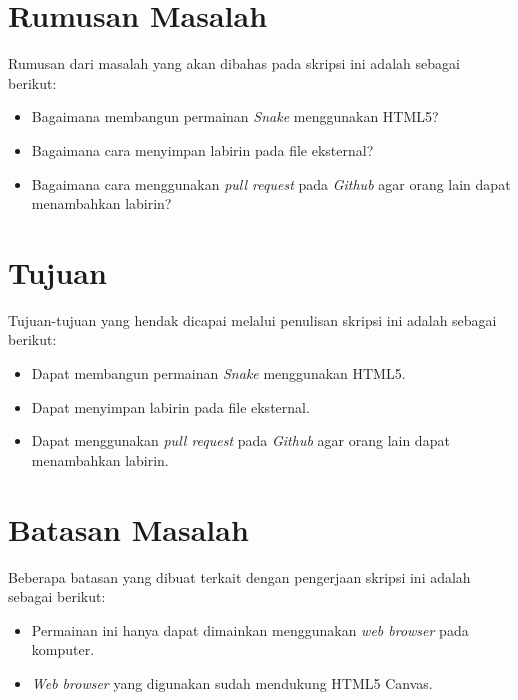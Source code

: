 \section{Rumusan Masalah}
\label{sec:rumusan}
Rumusan dari masalah yang akan dibahas pada skripsi ini adalah sebagai berikut:
\begin{itemize}
	\item Bagaimana membangun permainan \textit{Snake} menggunakan HTML5?
	\item Bagaimana cara menyimpan labirin pada file eksternal?
	\item Bagaimana cara menggunakan \textit{pull request} pada \textit{Github} agar orang lain dapat menambahkan labirin?
\end{itemize}


\section{Tujuan}
\label{sec:tujuan}
Tujuan-tujuan yang hendak dicapai melalui penulisan skripsi ini adalah sebagai berikut:
\begin{itemize}
	\item Dapat membangun permainan \textit{Snake} menggunakan HTML5.
	\item Dapat menyimpan labirin pada file eksternal.
	\item Dapat menggunakan \textit{pull request} pada \textit{Github} agar orang lain dapat menambahkan labirin.
\end{itemize}


\section{Batasan Masalah}
\label{sec:batasan}
Beberapa batasan yang dibuat terkait dengan pengerjaan skripsi ini adalah sebagai berikut:
\begin{itemize}
	\item Permainan ini hanya dapat dimainkan menggunakan \textit{web browser} pada komputer.
	\item \textit{Web browser} yang digunakan sudah mendukung HTML5 Canvas.
\end{itemize}


